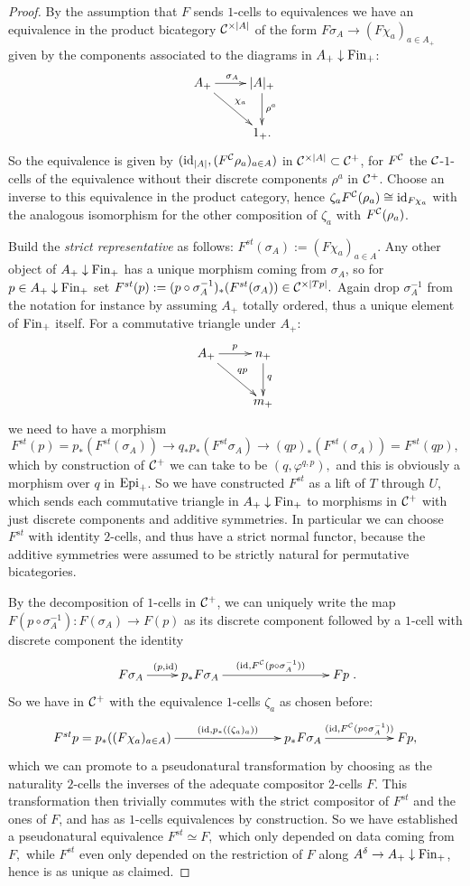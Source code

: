 {{{\begin{proof}
By the assumption that $F$ sends $1$-cells to equivalences we have
an equivalence in the product bicategory $\mathcal{C}^{\times |A|}$ of the
form $F\sigma_A\rightarrow (F\chi_a)_{a\in A_+}$ given by the
components associated to the diagrams in $A_+\downarrow\mathrm{Fin}_+$:
\[\xymatrix{A_+\ar[r]^{\sigma_A}\ar[dr]^{\chi_a} & |A|_+
\ar[d]^{\rho^a} \\	  & 1_+.}\]
So the equivalence is given by $(\operatorname{id}_{|A|},(F^{\mathcal{C}}\rho_a)_{a\in A})$ in 
$\mathcal{C}^{\times|A|}\subset \mathcal{C}^+$, for $F^{\mathcal{C}}$ the $\mathcal{C}$-$1$-cells of the 
equivalence without their discrete components $\rho^a$ in $\mathcal{C}^+$.
Choose an inverse to this equivalence in the product category, hence
$\zeta_a F^{\mathcal{C}}(\rho_a)\cong \operatorname{id}_{F\chi_a}$ with the analogous isomorphism
for the other composition of $\zeta_a$ with $F^{\mathcal{C}}(\rho_a)$.

Build the \emph{strict representative} as follows: $F^{st}(\sigma_A)
:= (F\chi_a)_{a\in A}$. Any other object of $A_+\downarrow\mathrm{Fin}_+$ has a unique 
morphism coming from $\sigma_A$, so for $p\in A_+\downarrow\mathrm{Fin}_+$ set 
$F^{st}(p):=(p\circ\sigma_A^{-1})_*(F^{st}(\sigma_A))\in\mathcal{C}^{\times
|Tp|}.$ Again drop $\sigma_A^{-1}$ from the notation for instance by
assuming $A_+$ totally ordered, thus a unique element of $\mathrm{Fin}_+$ itself.
For a commutative triangle under $A_+$:\[\xymatrix{ A_+\ar[r]^p
\ar[dr]^{qp}& n_+\ar[d]^q\\& m_+}\] we need to have a morphism
\[F^{st}(p)=p_*(F^{st}(\sigma_A))\rightarrow 
q_*p_*(F^{st}\sigma_A) \rightarrow (qp)_*(F^{st}(\sigma_A))=
F^{st}(qp),\] which by construction of $\mathcal{C}^+$ we can take to be 
$(q,\varphi^{q,p}),$ and this is obviously a morphism over $q$ in 
$\mathrm{Epi}_+$. So we have constructed $F^{st}$ as a lift of $T$ through $U$, 
which sends each commutative triangle in $A_+\downarrow\mathrm{Fin}_+$ to morphisms in $\mathcal{C}^+$ 
with just discrete components and additive symmetries. In particular
we can choose $F^{st}$ with identity $2$-cells, and thus have a 
strict normal functor, because the additive symmetries were assumed
to be strictly natural for permutative bicategories.

By the decomposition of $1$-cells in $\mathcal{C}^+$, we can uniquely write the
map $F(p\circ\sigma_A^{-1})\colon F(\sigma_A)\rightarrow F(p)$ as its
discrete component followed by a $1$-cell with discrete component the
identity \[\xymatrix{F\sigma_A \ar[r]^{(p,\id)} &p_*F\sigma_A 
\ar[rrr]^{(\id,F^\C(p\circ\sigma_A^{-1}))} &&& Fp}.\]
So we have in $\mathcal{C}^+$ with the equivalence $1$-cells $\zeta_a$ as 
chosen before: \[\xymatrix{F^{st}p = p_*((F\chi_a)_{a\in A}) 
\ar[rrr]^-{(\id,p_*((\zeta_a)_a))}&&& p_*F\sigma_A 
\ar[rr]^-{(\id,F^\C(p\circ\sigma_A^{-1}))}&& Fp,}\] which we can promote to 
a pseudonatural transformation by choosing as the naturality $2$-cells 
the inverses of the adequate compositor $2$-cells $F$. This 
transformation then trivially commutes with the strict compositor of 
$F^{st}$ and the ones of $F$, and has as $1$-cells equivalences by
construction. So we have established a pseudonatural equivalence 
$F^{st}\simeq F,$ which only depended on data coming from $F,$ 
while $F^{st}$ even only depended on the restriction of $F$ along 
$A^\delta\rightarrow A_+\downarrow\mathrm{Fin}_+$, hence is as unique as claimed.
\end{proof}}}

}

